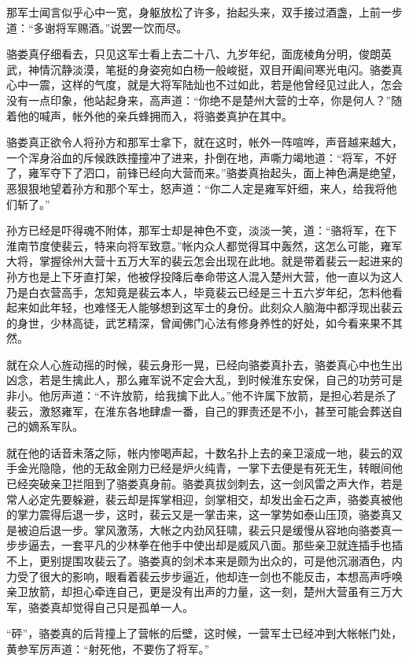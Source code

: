 那军士闻言似乎心中一宽，身躯放松了许多，抬起头来，双手接过酒盏，上前一步道：“多谢将军赐酒。”说罢一饮而尽。

骆娄真仔细看去，只见这军士看上去二十八、九岁年纪，面庞棱角分明，俊朗英武，神情沉静淡漠，笔挺的身姿宛如白杨一般峻挺，双目开阖间寒光电闪。骆娄真心中一震，这样的气度，就是大将军陆灿也不过如此，若是他曾经见过此人，怎会没有一点印象，他站起身来，高声道：“你绝不是楚州大营的士卒，你是何人？”随着他的喊声，帐外他的亲兵蜂拥而入，将骆娄真护在其中。

骆娄真正欲令人将孙方和那军士拿下，就在这时，帐外一阵喧哗，声音越来越大，一个浑身浴血的斥候跌跌撞撞冲了进来，扑倒在地，声嘶力竭地道：“将军，不好了，雍军夺下了泗口，前锋已经向大营而来。”骆娄真抬起头，面上神色满是绝望，恶狠狠地望着孙方和那个军士，怒声道：“你二人定是雍军奸细，来人，给我将他们斩了。”

孙方已经是吓得魂不附体，那军士却是神色不变，淡淡一笑，道：“骆将军，在下淮南节度使裴云，特来向将军致意。”帐内众人都觉得耳中轰然，这怎么可能，雍军大将，掌握徐州大营十五万大军的裴云怎会出现在此地。就是带着裴云一起进来的孙方也是上下牙直打架，他被俘投降后奉命带这人混入楚州大营，他一直以为这人乃是白衣营高手，怎知竟是裴云本人，毕竟裴云已经是三十五六岁年纪，怎料他看起来如此年轻，也难怪无人能够想到这军士的身份。此刻众人脑海中都浮现出裴云的身世，少林高徒，武艺精深，曾闻佛门心法有修身养性的好处，如今看来果不其然。

就在众人心旌动摇的时候，裴云身形一晃，已经向骆娄真扑去，骆娄真心中也生出凶念，若是生擒此人，那么雍军说不定会大乱，到时候淮东安保，自己的功劳可是非小。他厉声道：“不许放箭，给我擒下此人。”他不许属下放箭，是担心若是杀了裴云，激怒雍军，在淮东各地肆虐一番，自己的罪责还是不小，甚至可能会葬送自己的嫡系军队。

就在他的话音未落之际，帐内惨喝声起，十数名扑上去的亲卫滚成一地，裴云的双手金光隐隐，他的无敌金刚力已经是炉火纯青，一掌下去便是有死无生，转眼间他已经突破亲卫拦阻到了骆娄真身前。骆娄真拔剑刺去，这一剑风雷之声大作，若是常人必定先要躲避，裴云却是挥掌相迎，剑掌相交，却发出金石之声，骆娄真被他的掌力震得后退一步，这时，裴云又是一掌击来，这一掌势如泰山压顶，骆娄真又是被迫后退一步。掌风激荡，大帐之内劲风狂啸，裴云只是缓慢从容地向骆娄真一步步逼去，一套平凡的少林拳在他手中使出却是威风八面。那些亲卫就连插手也插不上，更别提围攻裴云了。骆娄真的剑术本来是颇为出众的，可是他沉溺酒色，内力受了很大的影响，眼看着裴云步步逼近，他却连一剑也不能反击，本想高声呼唤亲卫放箭，却担心牵连自己，更是没有出声的力量，这一刻，楚州大营虽有三万大军，骆娄真却觉得自己只是孤单一人。

“砰”，骆娄真的后背撞上了营帐的后壁，这时候，一营军士已经冲到大帐帐门处，黄参军厉声道：“射死他，不要伤了将军。”

